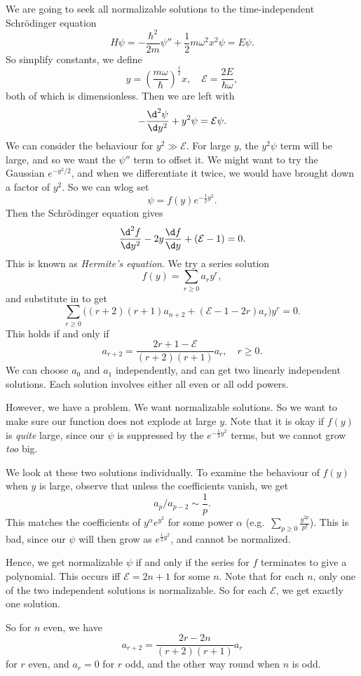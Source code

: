 \documentclass[a4paper]{article}
\begin{document}
We are going to seek all normalizable solutions to the time-independent Schr\"odinger equation
\[
  H\psi = -\frac{\hbar^2}{2m}\psi'' + \frac{1}{2}m\omega^2 x^2 \psi = E\psi.
\]
So simplify constants, we define
\[
  y = \left(\frac{m\omega}{\hbar}\right)^{\frac{1}{2}}x,\quad \mathcal{E} = \frac{2E}{\hbar \omega},
\]
both of which is dimensionless. Then we are left with
\[
  -\frac{\d^2 \psi}{\d y^2} + y^2\psi = \mathcal{E} \psi.
\]
We can consider the behaviour for $y^2 \gg \mathcal{E}$. For large $y$, the $y^2 \psi$ term will be large, and so we want the $\psi''$ term to offset it. We might want to try the Gaussian $e^{-y^2/2}$, and when we differentiate it twice, we would have brought down a factor of $y^2$. So we can wlog set
\[
  \psi = f(y) e^{-\frac{1}{2}y^2}.
\]
Then the Schr\"odinger equation gives
\[
  \frac{\d^2 f}{\d y^2} - 2y\frac{\d f}{\d y} + (\mathcal{E} - 1) = 0.
\]
This is known as \emph{Hermite's equation}. We try a series solution
\[
  f(y) = \sum_{r \geq 0} a_r y^r,
\]
and substitute in to get
\[
  \sum_{r \geq 0} \big( (r + 2)(r + 1)a_{n + 2} + (\mathcal{E} - 1 - 2r)a_r\big) y^r = 0.
\]
This holds if and only if
\[
  a_{r + 2} = \frac{2 r + 1 - \mathcal{E}}{(r + 2)(r + 1)} a_r,\quad r \geq 0.
\]
We can choose $a_0$ and $a_1$ independently, and can get two linearly independent solutions. Each solution involves either all even or all odd powers.

However, we have a problem. We want normalizable solutions. So we want to make sure our function does not explode at large $y$. Note that it is okay if $f(y)$ is \emph{quite} large, since our $\psi$ is suppressed by the $e^{-\frac{1}{2}y^2}$ terms, but we cannot grow \emph{too} big.

We look at these two solutions individually. To examine the behaviour of $f(y)$ when $y$ is large, observe that unless the coefficients vanish, we get
\[
  a_{p}/a_{p - 2} \sim \frac{1}{p}.
\]
This matches the coefficients of $y^\alpha e^{y^2}$ for some power $\alpha$ (e.g.\ $\sum_{p \geq 0} \frac{y^{2p}}{p!}$). This is bad, since our $\psi$ will then grow as $e^{\frac{1}{2}y^2}$, and cannot be normalized.

Hence, we get normalizable $\psi$ if and only if the series for $f$ terminates to give a polynomial. This occurs iff $\mathcal{E} = 2n + 1$ for some $n$. Note that for each $n$, only one of the two independent solutions is normalizable. So for each $\mathcal{E}$, we get exactly one solution.

So for $n$ even, we have
\[
  a_{r + 2} = \frac{2r - 2n}{(r + 2)(r + 1)} a_r
\]
for $r$ even, and $a_r = 0$ for $r$ odd, and the other way round when $n$ is odd.
\end{document}
